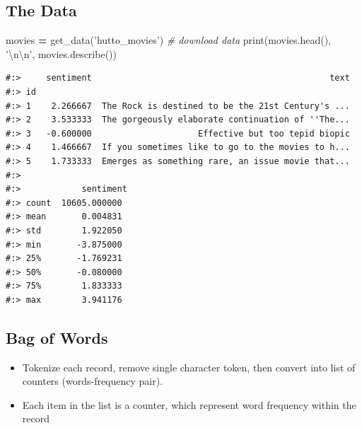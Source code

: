 \documentclass[
]{book}
\newenvironment{Shaded}{\begin{snugshade}}{\end{snugshade}}
\newcommand{\BuiltInTok}[1]{#1}
\newcommand{\CharTok}[1]{\textcolor[rgb]{0.5,0.5,0.5}{#1}}
\newcommand{\CommentTok}[1]{\textcolor[rgb]{0.37,0.37,0.37}{\textit{#1}}}
\newcommand{\NormalTok}[1]{#1}
\newcommand{\OperatorTok}[1]{\textcolor[rgb]{0.43,0.43,0.43}{\textbf{#1}}}
\newcommand{\StringTok}[1]{\textcolor[rgb]{0.5,0.5,0.5}{#1}}
\providecommand{\tightlist}{%
  \setlength{\itemsep}{0pt}\setlength{\parskip}{0pt}}
\begin{document}
\hypertarget{the-data-4}{%
\subsection{The Data}\label{the-data-4}}

\begin{Shaded}
\begin{Highlighting}[]
\NormalTok{movies }\OperatorTok{=}\NormalTok{ get_data(}\StringTok{'hutto_movies'}\NormalTok{)   }\CommentTok{# download data}
\BuiltInTok{print}\NormalTok{(movies.head(), }\StringTok{'}\CharTok{\textbackslash{}n\textbackslash{}n}\StringTok{'}\NormalTok{,}
\NormalTok{      movies.describe())}
\end{Highlighting}
\end{Shaded}

\begin{verbatim}
#:>     sentiment                                               text
#:> id                                                              
#:> 1    2.266667  The Rock is destined to be the 21st Century's ...
#:> 2    3.533333  The gorgeously elaborate continuation of ''The...
#:> 3   -0.600000                     Effective but too tepid biopic
#:> 4    1.466667  If you sometimes like to go to the movies to h...
#:> 5    1.733333  Emerges as something rare, an issue movie that... 
#:> 
#:>            sentiment
#:> count  10605.000000
#:> mean       0.004831
#:> std        1.922050
#:> min       -3.875000
#:> 25%       -1.769231
#:> 50%       -0.080000
#:> 75%        1.833333
#:> max        3.941176
\end{verbatim}

\hypertarget{bag-of-words}{%
\subsection{Bag of Words}\label{bag-of-words}}

\begin{itemize}
\tightlist
\item
  Tokenize each record, remove single character token, then convert into list of counters (words-frequency pair).\\
\item
  Each item in the list is a counter, which represent word frequency within the record
\end{itemize}
\end{document}
